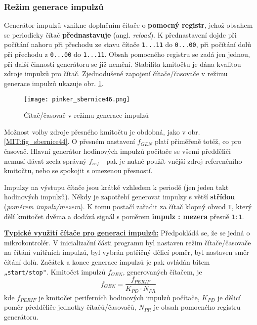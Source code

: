       \subsubsection{Režim generace impulzů}
        Generátor impulzů vznikne doplněním čítače o \textbf{pomocný registr}, jehož obsahem se 
        periodicky čítač \textbf{přednastavuje} (angl. \emph{reload}). K přednastavení dojde při 
        počítání nahoru při přechodu ze stavu čítače \texttt{1...11} do \texttt{0...00}, při 
        počítání dolů při přechodu z \texttt{0...00} do \texttt{1...11}. Obsah pomocného registru 
        se zadá jen jednou, při další činnosti generátoru se již nemění. Stabilita kmitočtu je dána 
        kvalitou zdroje impulzů pro čítač. Zjednodušené zapojení čítače/časovače v režimu generace 
        impulzů ukazuje obr. \ref{MIT:fig_sbernice46}.
        
        \begin{figure}[ht!] %
          \centering
          \texttt{[image: pinker\_sbernice46.png]}
          \caption{Čítač/časovač v režimu generace impulzů}
          \label{MIT:fig_sbernice46}
        \end{figure}
        
        Možnost volby zdroje přesného kmitočtu je obdobná, jako v obr. \ref{MIT:fig_sbernice44}. O 
        přesném nastavení \(f_{GEN}\) platí přiměřeně totéž, co pro časovač. Hlavní generátor 
        hodinových impulzů počítače se všemi předděliči nemusí dávat zcela správný \(f_{ref}\) - 
        pak je nutné použít vnější zdroj referenčního kmitočtu, nebo se spokojit s omezenou 
        přesností.
        
        Impulzy na výstupu čítače jsou krátké vzhledem k periodě (jen jeden takt hodinových 
        impulzů). Někdy je zapotřebí generovat impulzy s větší \textbf{střídou} (\emph{poměrem 
        impulz/mezera}). K tomu postačí zařadit za čítač klopný obvod \texttt{T}, který dělí 
        kmitočet dvěma a dodává signál s poměrem \textbf{impulz : mezera} přesně \texttt{1:1}.
        
        \underline{\textbf{Typické využití čítače pro generaci impulzů:}}
        Předpokládá se, že se jedná o mikrokontrolér. V inicializační části programu byl nastaven 
        režim čítače/časovače na čítání vnitřních impulzů, byl vybrán patřičný dělicí poměr, byl 
        nastaven směr čítání dolů. Začátek a konec generace impulzů je pak ovládán bitem 
        \texttt{„start/stop"}. Kmitočet impulzů \(f_{GEN}\), generovaných čítačem, je
        \begin{equation}
          f_{GEN} = \frac{f_{PERIF}}{K_{PD} \cdot N_{PR}}
        \end{equation}         
        kde \(f_{PERIF}\) je kmitočet periferních hodinových impulzů počítače, \(K_{PD}\) je dělicí 
        poměr předděliče jednotky čítačů/časovačů, \(N_{PR}\) je obsah pomocného registru 
        generátoru.
        

